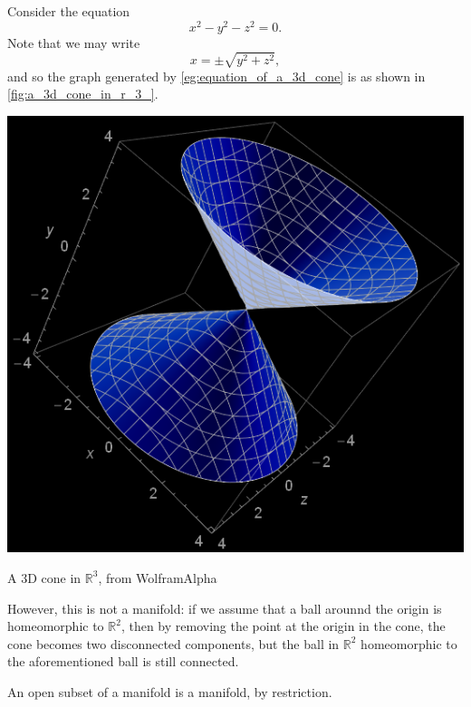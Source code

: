 \documentclass[notoc,notitlepage]{tufte-book}
\begin{document}
\begin{eg}
  Consider the equation
  \begin{equation}\label{eg:equation_of_a_3d_cone}
    x^2 - y^2 - z^2 = 0.
  \end{equation}
  Note that we may write
  \begin{equation*}
    x = \pm \sqrt{ y^2 + z^2 },
  \end{equation*}
  and so the graph generated by \cref{eg:equation_of_a_3d_cone} is as shown in
  \cref{fig:a_3d_cone_in_r_3_}.
  \begin{marginfigure}
    \centering
    \includegraphics[width=\marginparwidth]{images/3d_cone.png}
    \caption{A 3D cone in $\mathbb{R}^3$, from WolframAlpha}\label{fig:a_3d_cone_in_r_3_}
  \end{marginfigure}
  However, this is not a manifold: if we assume that a ball arounnd the origin
  is homeomorphic to $\mathbb{R}^2$, then by removing the point at the origin
  in the cone, the cone becomes two disconnected components, but the ball in
  $\mathbb{R}^2$ homeomorphic to the aforementioned ball is still connected.
\end{eg}

\begin{note}
  An open subset of a manifold is a manifold, by restriction.
\end{note}
\end{document}

